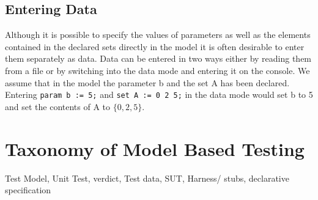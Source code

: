 \subsection{Entering Data}
Although it is possible to specify the values of parameters as well as the elements contained in the declared sets directly in the model it is often desirable to enter them separately as data. Data can be entered in two ways either by reading them from a file or by switching into the data mode and entering it on the console. We assume that in the model the parameter b and the set A has been declared. Entering \verb&param b := 5;& and \verb&set A := 0 2 5;& in the data mode would set b to 5 and set the contents of A to $\lbrace 0,2,5\rbrace$.
\section{Taxonomy of Model Based Testing}
Test Model,
Unit Test,
verdict,
Test data,
SUT,
Harness/ stubs,
declarative specification

